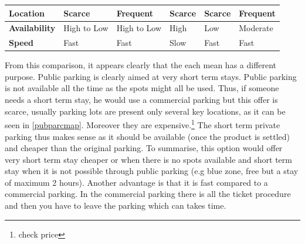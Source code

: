 \documentclass[12pt,a4paper,oneside]{book}
\begin{document}
\begin{table}[h]
\begin{adjustbox}{center}
\begin{tabular}{l|l|l|l|l|l|}
\multicolumn{1}{|l|}{\textbf{Location}}     & Scarce                             & Frequent                                                     & Scarce                                                                                                      & Scarce                                                                                                             & Frequent                                                                                                            \\ \hline
\multicolumn{1}{|l|}{\textbf{Availability}} & High to Low                        & High to Low                                                  & High                                                                                                        & Low                                                                                                                & Moderate                                                                                                            \\ \hline
\multicolumn{1}{|l|}{\textbf{Speed}}        & Fast                               & Fast                                                         & Slow                                                                                                        & Fast                                                                                                               & Fast                                                                                                                \\ \hline
\end{tabular}
\end{adjustbox}
\end{table}

From this comparison, it appears clearly that the each mean has a different purpose. Public parking is clearly aimed at very short term stays. Public parking is not available all the time as the spots might all be used. Thus, if someone needs a short term stay, he would use a commercial parking but this offer is scarce, usually parking lots are present only several key locations, as it can be seen in \autoref{pubparcmap}. Moreover they are expensive.\footnote{check price} The short term private parking thus makes sense as it should be available (once the product is settled) and cheaper than the original parking. To summarise, this option would offer very short term stay cheaper or when there is no spots available and short term stay when it is not possible through public parking (e.g blue zone, free but a stay of maximum 2 hours). Another advantage is that it is fast compared to a commercial parking. In the commercial parking there is all the ticket procedure and then you have to leave the parking which can takes time.\\
\end{document}
